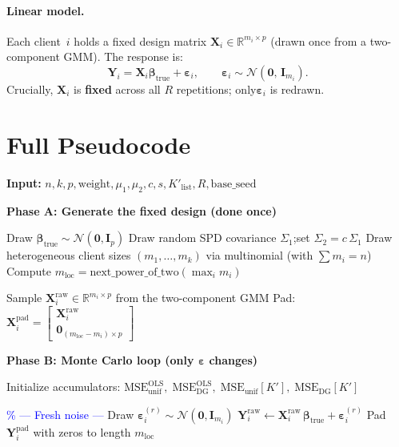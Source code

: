 \documentclass[11pt,a4paper]{article}
\newcommand{\bX}{\mathbf{X}}
\newcommand{\bY}{\mathbf{Y}}
\newcommand{\bbeta}{\boldsymbol{\beta}}
\newcommand{\beps}{\boldsymbol{\varepsilon}}
\newcommand{\bI}{\mathbf{I}}
\newcommand{\MSE}{\mathrm{MSE}}
\newcommand{\OLS}{\mathrm{OLS}}
\begin{document}
\paragraph{Linear model.}
Each client~$i$ holds a fixed design matrix $\bX_i \in \mathbb{R}^{m_i \times p}$
(drawn once from a two-component GMM). The response is:
\[
  \bY_i = \bX_i \bbeta_{\mathrm{true}} + \beps_i,
  \qquad \beps_i \sim \mathcal{N}(\mathbf{0},\, \bI_{m_i}).
\]
Crucially, $\bX_i$ is \textbf{fixed} across all $R$ repetitions; only$\beps_i$ is redrawn.
\section{Full Pseudocode}

\begin{algorithm}[H]
\caption{\textsc{run\_experiment\_DGSRHT}: Empirical + Theoretical RE}
\label{alg:main}
\begin{algorithmic}[1]

\Statex \textbf{Input:} $n, k, p, \text{weight}, \mu_1, \mu_2, c, s, K'_{\text{list}}, R, \text{base\_seed}$

\Statex
\Statex \hrulefill
\Statex \textbf{Phase A: Generate the fixed design (done once)}
\Statex \hrulefill

\State Draw $\bbeta_{\mathrm{true}} \sim \mathcal{N}(\mathbf{0}, \bI_p)$
\State Draw random SPD covariance $\Sigma_1$;\quad set $\Sigma_2 = c\,\Sigma_1$
\State Draw heterogeneous client sizes $(m_1, \dots, m_k)$ via multinomial (with $\sum m_i = n$)
\State Compute $m_{\mathrm{loc}} = \text{next\_power\_of\_two}(\max_i m_i)$

  \State Sample $\bX_i^{\mathrm{raw}} \in \mathbb{R}^{m_i \times p}$ from the two-component GMM
  \State Pad: $\bX_i^{\mathrm{pad}} = \begin{bmatrix} \bX_i^{\mathrm{raw}} \\ \mathbf{0}_{(m_{\mathrm{loc}} - m_i) \times p} \end{bmatrix}$
\EndFor

\Statex
\Statex \hrulefill
\Statex \textbf{Phase B: Monte Carlo loop (only $\beps$ changes)}
\Statex \hrulefill

\State Initialize accumulators: $\MSE^{\OLS}_{\mathrm{unif}},\; \MSE^{\OLS}_{\mathrm{DG}},\; \MSE_{\mathrm{unif}}[K'],\; \MSE_{\mathrm{DG}}[K']$


  \Statex \quad\textcolor{blue}{\% --- Fresh noise ---}
    \State Draw $\beps_i^{(r)} \sim \mathcal{N}(\mathbf{0}, \bI_{m_i})$
    \State $\bY_i^{\mathrm{raw}} \gets \bX_i^{\mathrm{raw}}\,\bbeta_{\mathrm{true}} + \beps_i^{(r)}$
    \State Pad $\bY_i^{\mathrm{pad}}$ with zeros to length $m_{\mathrm{loc}}$
  \EndFor


\end{algorithmic}
\end{algorithm}
\end{document}
